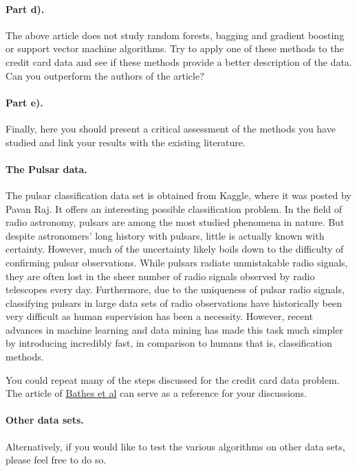 \documentclass[%
oneside,                 %
final,                   %
10pt]{article}
\begin{document}
\paragraph{Part d).}
The above article does not study random forests, bagging and gradient boosting or support vector
machine algorithms. Try to apply one of these methods to the
credit card data and see if these methods provide a better description
of the data. Can you outperform the authors of the article?

\paragraph{Part e).}
Finally, here you should present a critical assessment of the methods
you have studied and link your results with the existing literature.



\paragraph{The Pulsar data.}
The pulsar classification data set is obtained from
Kaggle, where it was posted by Pavan Raj. It offers an interesting
possible classification problem. In the field of radio astronomy,
pulsars are among the most studied phenomena in nature. But despite
astronomers' long history with pulsars, little is actually known with
certainty. However, much of the uncertainty likely boils down to the
difficulty of confirming pulsar observations. While pulsars radiate
unmistakable radio signals, they are often lost in the sheer number of
radio signals observed by radio telescopes every day. Furthermore, due
to the uniqueness of pulsar radio signals, classifying pulsars in
large data sets of radio observations have historically been very
difficult as human supervision has been a necessity. However, recent
advances in machine learning and data mining has made this task
much simpler by introducing incredibly fast, in comparison to humans
that is, classification methods.

You could repeat many of the steps discussed for the credit card data problem.
The article of \href{{https://arxiv.org/abs/1209.0793}}{Bathes et al} can serve as a reference for your discussions.

\paragraph{Other data sets.}
Alternatively, if you would like to test the various algorithms on other data sets, please feel free to do so.
\end{document}
